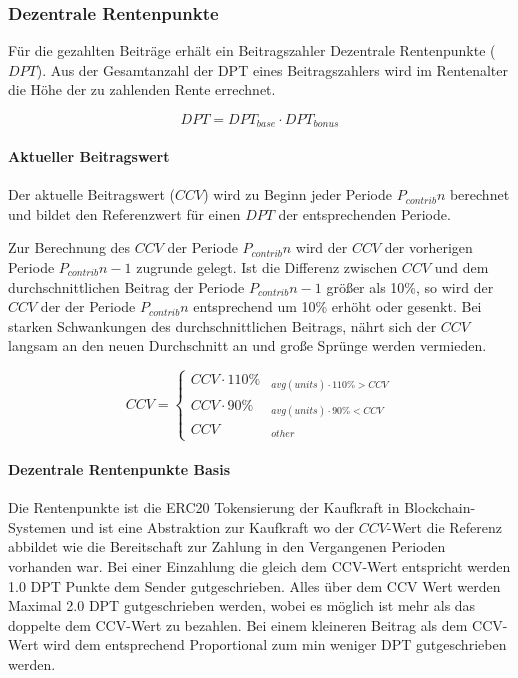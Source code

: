 \subsubsection*{Dezentrale Rentenpunkte}
Für die gezahlten Beiträge erhält ein Beitragszahler Dezentrale Rentenpunkte
($DPT$). Aus der Gesamtanzahl der DPT eines Beitragszahlers wird im Rentenalter
die Höhe der zu zahlenden Rente errechnet.

\begin{equation}
DPT = DPT_{base} \cdot DPT_{bonus}
\end{equation}

\paragraph*{Aktueller Beitragswert}
Der aktuelle Beitragswert ($CCV$) wird zu Beginn jeder Periode 
$P_{contrib}{n}$ berechnet und bildet den Referenzwert für einen $DPT$ der
entsprechenden Periode.

Zur Berechnung des $CCV$ der Periode $P_{contrib}{n}$ wird der $CCV$ der vorherigen
Periode $P_{contrib}{n-1}$ zugrunde gelegt. Ist die Differenz zwischen $CCV$ und dem
durchschnittlichen Beitrag der Periode $P_{contrib}{n-1}$ größer als 10\%, so wird
der $CCV$ der der Periode $P_{contrib}{n}$ entsprechend um 10\% erhöht oder gesenkt.
Bei starken Schwankungen des durchschnittlichen Beitrags, nährt sich der $CCV$ langsam an den neuen Durchschnitt an und große Sprünge werden vermieden.

\begin{equation}
CCV = \begin{cases} 
CCV \cdot 110\% & _{avg(units) \cdot 110\% > CCV} \\
CCV \cdot 90\% & _{avg(units) \cdot 90\% < CCV} \\
CCV & _{other}
\end{cases}
\end{equation}

\paragraph*{Dezentrale Rentenpunkte Basis}
Die Rentenpunkte ist die ERC20 Tokensierung der Kaufkraft in Blockchain-Systemen und ist eine Abstraktion zur Kaufkraft wo der $CCV$-Wert die Referenz abbildet wie die Bereitschaft zur Zahlung in den Vergangenen Perioden vorhanden war. Bei einer Einzahlung die gleich dem CCV-Wert entspricht werden 1.0 DPT Punkte dem Sender gutgeschrieben. Alles über dem CCV Wert werden Maximal 2.0 DPT gutgeschrieben werden, wobei es möglich ist mehr als das doppelte dem CCV-Wert zu bezahlen. Bei einem kleineren Beitrag als dem CCV-Wert wird dem entsprechend Proportional zum min weniger DPT gutgeschrieben werden.

